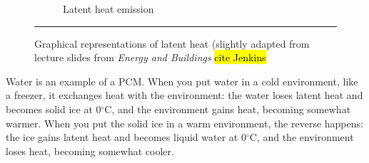 \begin{figure}[htbp]
\begin{subfigure}{.47\textwidth}
		\caption{Latent heat emission}
		\label{fig:latentheatemission}
	\end{subfigure}
	\rule{\textwidth}{0.5pt} %
	\caption[Graphical representations of latent heat.]{Graphical representations of latent heat (slightly adapted from lecture slides from \textit{Energy and Buildings} \hl{cite Jenkins}
	}
	\label{fig:latentheat}
\end{figure}


Water is an example of a PCM.
When you put water in a cold environment, like a freezer, it exchanges heat with the environment: the water loses latent heat and becomes solid ice at 0$^{\circ}$C, and the environment gains heat, becoming somewhat warmer.
When you put the solid ice in a warm environment, the reverse happens: the ice gains latent heat and becomes liquid water at 0$^{\circ}$C, and the environment loses heat, becoming somewhat cooler.


